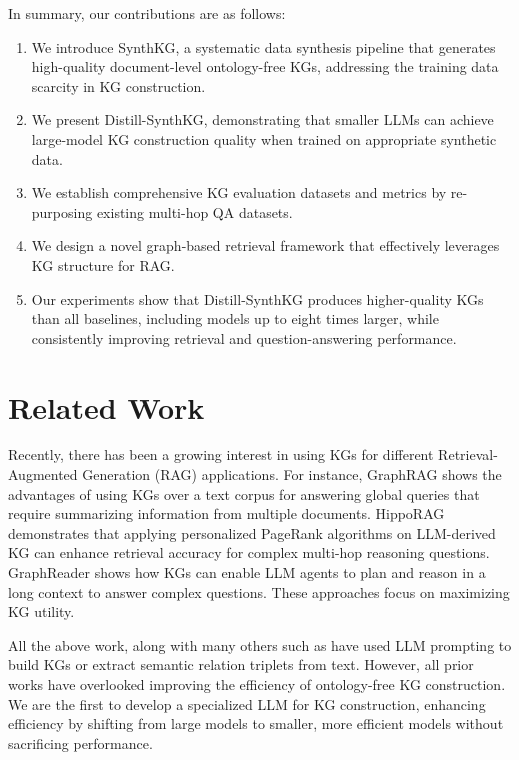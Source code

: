 \documentclass{article} %
\begin{document}
In summary, our contributions are as follows:
\begin{enumerate}[noitemsep,leftmargin=*]
\setlength\itemsep{0.01em}
    \item We introduce SynthKG, a systematic data synthesis pipeline that generates high-quality document-level ontology-free KGs, addressing the training data scarcity in KG construction.
    \item We present Distill-SynthKG, demonstrating that smaller LLMs can achieve large-model KG construction quality when trained on appropriate synthetic data.
    \item We establish comprehensive KG evaluation datasets and metrics by re-purposing existing multi-hop QA datasets.
    \item We design a novel graph-based retrieval framework that effectively leverages KG structure for RAG.
    \item Our experiments show that Distill-SynthKG produces higher-quality KGs than all baselines, including models up to eight times larger, while consistently improving retrieval and question-answering performance.
\end{enumerate}


\section{Related Work}
Recently, there has been a growing interest in using KGs for different Retrieval-Augmented Generation (RAG) applications. For instance, GraphRAG \citep{edge2024from} shows the advantages of using KGs over a text corpus for answering global queries that require summarizing information from multiple documents. HippoRAG \citep {gutiérrez2024hipporag} demonstrates that applying personalized PageRank algorithms on LLM-derived KG can enhance retrieval accuracy for complex multi-hop reasoning questions. GraphReader \citep{li2024graphreaderbuildinggraphbasedagent} shows how KGs can enable LLM agents to plan and reason in a long context to answer complex questions. These approaches focus on maximizing KG utility.

All the above work, along with many others such as \citet{chia2022relationpromptleveragingpromptsgenerate, trajanoska2023enhancingknowledgegraphconstruction, chen2023autokgefficientautomatedknowledge, Zhang2023LLM-QA4RE, nayak2023llm2kbconstructingknowledgebases, mihindukulasooriya2023text2kgbench, zhu2024llmsknowledgegraphconstruction, jiao-etal-2023-instruct, khorashadizadeh2023exploringincontextlearningcapabilities, han2024pivepromptingiterativeverification, yao2024exploringlargelanguagemodels, bi2024codekgccodelanguagemodel, ding2024automatedconstructionthemespecificknowledge, sanmartin2024kgragbridginggapknowledge, 10.1145/3589334.3645678, 10.1145/3539618.3591763,Chase_LangChain_2022} have used LLM prompting to build KGs or extract semantic relation triplets from text. 
However, all prior works have overlooked improving the efficiency of ontology-free KG construction. We are the first to develop a specialized LLM for KG construction, enhancing efficiency by shifting from large models to smaller, more efficient models without sacrificing performance.
\end{document}
